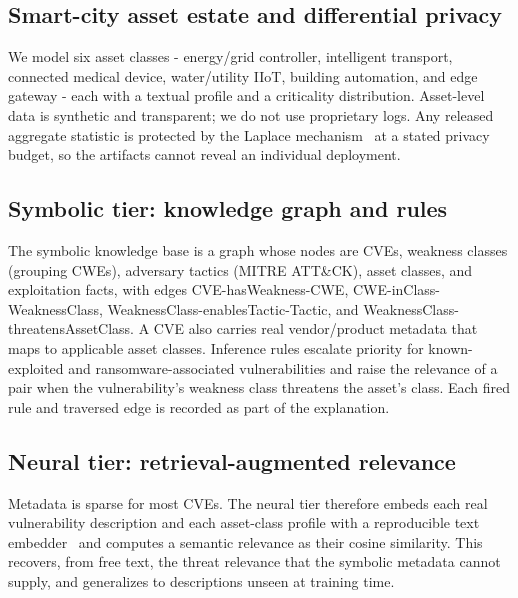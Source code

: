 \documentclass[journal]{IEEEtran}
\begin{document}
\subsection{Smart-city asset estate and differential privacy}
We model six asset classes - energy/grid controller, intelligent transport,
connected medical device, water/utility IIoT, building automation, and edge
gateway - each with a textual profile and a criticality distribution.
Asset-level data is synthetic and transparent; we do not use proprietary logs.
Any released aggregate statistic is protected by the Laplace
mechanism~\cite{dwork2014dp} at a stated privacy budget, so the artifacts cannot
reveal an individual deployment.

\subsection{Symbolic tier: knowledge graph and rules}
The symbolic knowledge base is a graph whose nodes are CVEs, weakness classes
(grouping CWEs), adversary tactics (MITRE ATT\&CK), asset classes, and
exploitation facts, with edges CVE-hasWeakness-CWE, CWE-inClass-WeaknessClass,
WeaknessClass-enablesTactic-Tactic, and WeaknessClass-threatensAssetClass. A CVE
also carries real vendor/product metadata that maps to applicable asset classes.
Inference rules escalate priority for known-exploited and ransomware-associated
vulnerabilities and raise the relevance of a pair when the vulnerability's
weakness class threatens the asset's class. Each fired rule and traversed edge
is recorded as part of the explanation.

\subsection{Neural tier: retrieval-augmented relevance}
Metadata is sparse for most CVEs. The neural tier therefore embeds each real
vulnerability description and each asset-class profile with a reproducible text
embedder~\cite{nussbaum2024nomic} and computes a semantic relevance as their
cosine similarity. This recovers, from free text, the threat relevance that the
symbolic metadata cannot supply, and generalizes to descriptions unseen at
training time.
\end{document}
